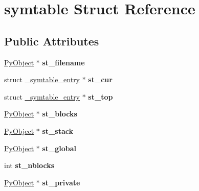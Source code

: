 \hypertarget{structsymtable}{}\section{symtable Struct Reference}
\label{structsymtable}
\subsection*{Public Attributes}
\begin{DoxyCompactItemize}
\item 
\hyperlink{struct__object}{Py\+Object} $\ast$ {\bfseries st\+\_\+filename}\hypertarget{structsymtable_a3a75559c0160e93600882ad8d51f1cbe}{}\label{structsymtable_a3a75559c0160e93600882ad8d51f1cbe}

\item 
struct \hyperlink{struct__symtable__entry}{\+\_\+symtable\+\_\+entry} $\ast$ {\bfseries st\+\_\+cur}\hypertarget{structsymtable_ae79ef4b7d6cd0f034c75561fb4ae5aa0}{}\label{structsymtable_ae79ef4b7d6cd0f034c75561fb4ae5aa0}

\item 
struct \hyperlink{struct__symtable__entry}{\+\_\+symtable\+\_\+entry} $\ast$ {\bfseries st\+\_\+top}\hypertarget{structsymtable_a1e660bc90af2b75c54cf04c639dd6d29}{}\label{structsymtable_a1e660bc90af2b75c54cf04c639dd6d29}

\item 
\hyperlink{struct__object}{Py\+Object} $\ast$ {\bfseries st\+\_\+blocks}\hypertarget{structsymtable_a0cdfefdd535d12f0f2b9587d23a9ac7e}{}\label{structsymtable_a0cdfefdd535d12f0f2b9587d23a9ac7e}

\item 
\hyperlink{struct__object}{Py\+Object} $\ast$ {\bfseries st\+\_\+stack}\hypertarget{structsymtable_a86921f5d2e12dee08427e02bac3a95ee}{}\label{structsymtable_a86921f5d2e12dee08427e02bac3a95ee}

\item 
\hyperlink{struct__object}{Py\+Object} $\ast$ {\bfseries st\+\_\+global}\hypertarget{structsymtable_a7c81861d1b92f6354eee2de2e83585fd}{}\label{structsymtable_a7c81861d1b92f6354eee2de2e83585fd}

\item 
int {\bfseries st\+\_\+nblocks}\hypertarget{structsymtable_a5a1d9787075312c4d687157e452235b9}{}\label{structsymtable_a5a1d9787075312c4d687157e452235b9}

\item 
\hyperlink{struct__object}{Py\+Object} $\ast$ {\bfseries st\+\_\+private}\hypertarget{structsymtable_a9de0bc82e83fa302373057f56043fdbb}{}\label{structsymtable_a9de0bc82e83fa302373057f56043fdbb}


\end{DoxyCompactItemize}

